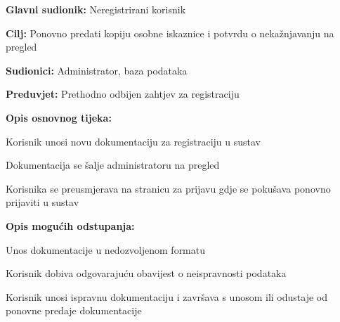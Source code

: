 						\begin{packed_item}
							
							\item \textbf{Glavni sudionik: }Neregistrirani korisnik
							\item  \textbf{Cilj:} Ponovno predati kopiju osobne iskaznice i potvrdu o nekažnjavanju na pregled
							\item  \textbf{Sudionici:} Administrator, baza podataka
							\item  \textbf{Preduvjet:} Prethodno odbijen zahtjev za registraciju
							\item  \textbf{Opis osnovnog tijeka:}
							
							\item[] \begin{packed_enum}
								
								\item Korisnik unosi novu dokumentaciju za registraciju u sustav 
								\item Dokumentacija se šalje administratoru na pregled 
								\item Korisnika se preusmjerava na stranicu za prijavu gdje se pokušava ponovno prijaviti u sustav 
								
								
							\end{packed_enum}
							
							\item  \textbf{Opis mogućih odstupanja:}
							
							\item[] \begin{packed_item}
								
								\item[1.a] Unos dokumentacije u nedozvoljenom formatu 
								\item[] \begin{packed_enum}
									
									\item Korisnik dobiva odgovarajuću obavijest o neispravnosti podataka  
									\item Korisnik unosi ispravnu dokumentaciju i završava s unosom ili odustaje od ponovne predaje dokumentacije  
									
								\end{packed_enum}
								
								
							\end{packed_item}
						\end{packed_item}
						\noindent {}
